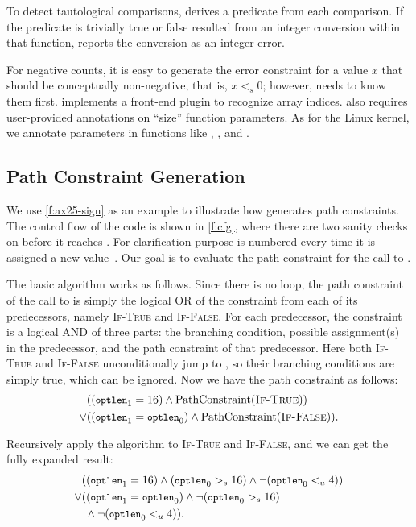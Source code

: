 To detect tautological comparisons, \sys derives a predicate from
each comparison.  If the predicate is trivially true or false
resulted from an integer conversion within that function, \sys
reports the conversion as an integer error.

For negative counts, it is easy to generate the error constraint
for a value $x$ that should be conceptually non-negative, that is,
$x <_s 0$; however, \sys needs to know them first.  \sys implements
a front-end plugin to recognize array indices.  \sys also requires
user-provided annotations on ``size'' function parameters.  As for
the Linux kernel, we annotate parameters in functions like ,
, and .

\subsection{Path Constraint Generation}
\label{s:gen:path}

We use \autoref{f:ax25-sign} as an example to illustrate how \sys
generates path constraints.  The control flow of the code is shown
in \autoref{f:cfg}, where there are two sanity checks on 
before it reaches .  For clarification purpose
 is numbered every time it is assigned a new
value~\cite[\chapterautorefname~8.11]{whale}.  Our goal is to
evaluate the path constraint for the call to .

The basic algorithm works as follows.  Since there is no loop, the
path constraint of the call to  is simply the
logical OR of the constraint from each of its predecessors, namely
\textsc{If-True} and \textsc{If-False}.  For each predecessor, the
constraint is a logical AND of three parts: the branching condition,
possible assignment(s) in the predecessor, and the path constraint
of that predecessor.  Here both \textsc{If-True} and \textsc{If-False}
unconditionally jump to , so their branching
conditions are simply true, which can be ignored.  Now we have the
path constraint as follows:
\newcommand{\optlen}{{\small \texttt{optlen}}}
\newcommand{\pc}{\textrm{PathConstraint}}
%
\begin{align*}
& ((\optlen_1 = 16) \land \pc(\textsc{If-True})) \\
\lor & ((\optlen_1 = \optlen_0) \land \pc(\textsc{If-False})).
\end{align*}

Recursively apply the algorithm to \textsc{If-True} and \textsc{If-False},
and we can get the fully expanded result:
%
\begin{align*}
& ((\optlen_1 = 16) \land (\optlen_0 >_s 16)
    \land \neg(\optlen_0 <_u 4)) \\
\lor & ((\optlen_1 = \optlen_0) \land \neg(\optlen_0 >_s 16) \\
     & \; \land \neg(\optlen_0 <_u 4)).
\end{align*}

